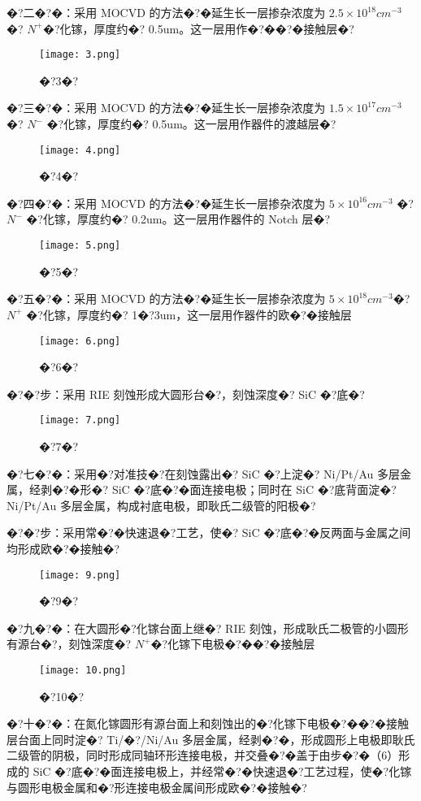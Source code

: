 \documentclass{zjureport}
\begin{document}
�?二�?�：采用 MOCVD 的方法�?�延生长一层掺杂浓度为 $2.5×10^{18}cm^{-3}$ �? $N^+$�?化镓，厚度约�? 0.5um。这一层用作�?��?�接触层�?
\begin{figure}[htbp]
	\centering
	\texttt{[image: 3.png]}
	\caption{�?3�?}
\end{figure}

�?三�?�：采用 MOCVD 的方法�?�延生长一层掺杂浓度为  $1.5×10^{17}cm^{-3}$ �? $N^-$ �?化镓，厚度约�? 0.5um。这一层用作器件的渡越层�?
\begin{figure}[htbp]
	\centering
	\texttt{[image: 4.png]}
	\caption{�?4�?}
\end{figure}

�?四�?�：采用 MOCVD 的方法�?�延生长一层掺杂浓度为  $5×10^{16}cm^{-3}$ �? $N^-$ �?化镓，厚度约�? 0.2um。这一层用作器件的 Notch 层�?
\begin{figure}[htbp]
	\centering
	\texttt{[image: 5.png]}
	\caption{�?5�?}
\end{figure}

�?五�?�：采用 MOCVD 的方法�?�延生长一层掺杂浓度为  $5×10^{18}cm^{-3}$�? $N^+$ �?化镓，厚度约�? 1�?3um，这一层用作器件的欧�?�接触层
\begin{figure}[htbp]
	\centering
	\texttt{[image: 6.png]}
	\caption{�?6�?}
\end{figure}

�?�?步：采用 RIE 刻蚀形成大圆形台�?，刻蚀深度�? SiC �?底�?
\begin{figure}[htbp]
	\centering
	\texttt{[image: 7.png]}
	\caption{�?7�?}
\end{figure}

�?七�?�：采用�?对准技�?在刻蚀露出�? SiC �?上淀�? Ni/Pt/Au 多层金属，经剥�?�形�? SiC �?底�?�面连接电极；同时在 SiC �?底背面淀�? Ni/Pt/Au 多层金属，构成衬底电极，即耿氏二级管的阳极�?

�?�?步：采用常�?�快速退�?工艺，使�? SiC �?底�?�反两面与金属之间均形成欧�?�接触�?
\begin{figure}[htbp]
	\centering
	\texttt{[image: 9.png]}
	\caption{�?9�?}
\end{figure}

�?九�?�：在大圆形�?化镓台面上继�? RIE 刻蚀，形成耿氏二极管的小圆形有源台�?，刻蚀深度�? $N^+$�?化镓下电极�?��?�接触层
\begin{figure}[htbp]
	\centering
	\texttt{[image: 10.png]}
	\caption{�?10�?}
\end{figure}

�?十�?�：在氮化镓圆形有源台面上和刻蚀出的�?化镓下电极�?��?�接触层台面上同时淀�? Ti/�?/Ni/Au 多层金属，经剥�?�，形成圆形上电极即耿氏二级管的阴极，同时形成同轴环形连接电极，并交叠�?�盖于由步�?�（6）形成的 SiC �?底�?�面连接电极上，并经常�?�快速退�?工艺过程，使�?化镓与圆形电极金属和�?形连接电极金属间形成欧�?�接触�?
\end{document}
